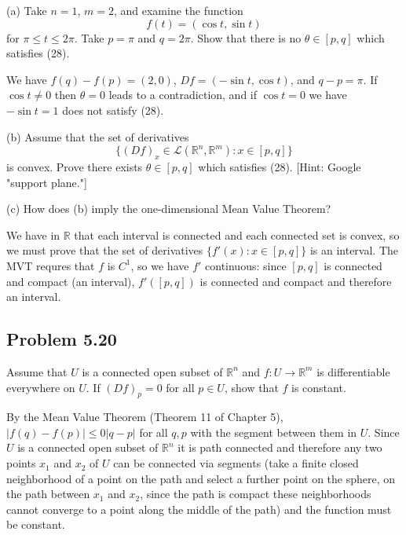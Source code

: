 \documentclass{amsart}
\begin{document}
(a) Take \( n = 1 \), \( m = 2 \), and examine the function
\[
f(t) = (\cos t, \sin t)
\]
for \( \pi \leq t \leq 2\pi \). Take \( p = \pi \) and \( q = 2\pi \). Show that 
there is no \( \theta \in [p,q] \) which satisfies (28).

\medskip \noindent We have $f(q)-f(p)=(2,0)$, $Df=(-\sin t, \cos t)$, and $q-p=\pi$.
If $\cos t\neq 0$ then $\theta=0$ leads to a contradiction, and if $\cos t=0$ we have 
$-\sin t = 1$ does not satisfy (28).

(b) Assume that the set of derivatives
\[
\{ (Df)_x \in \mathcal{L}(\mathbb{R}^n, \mathbb{R}^m) : x \in [p,q] \}
\]
is convex. Prove there exists \( \theta \in [p,q] \) which satisfies (28). 
[Hint: Google "support plane."]

(c) How does (b) imply the one-dimensional Mean Value Theorem?

\medskip \noindent We have in $\mathbb{R}$ that each interval is connected and each connected
set is convex, so we must prove that the set of derivatives $\{f'(x): x\in[p,q]\}$ is an interval. 
The MVT requres that $f$ is $C^1$, so we have $f'$ continuous: since $[p,q]$ is connected and compact
(an interval), $f'([p,q])$ is connected and compact and therefore an interval.

\newpage

\subsection*{Problem 5.20} Assume that \( U \) is a connected open subset 
of \( \mathbb{R}^n \) and \( f : U \rightarrow \mathbb{R}^m \) is differentiable 
everywhere on \( U \). If \( (Df)_p = 0 \) for all \( p \in U \), show that \( f \) is constant.

\medskip \noindent By the Mean Value Theorem (Theorem 11 of Chapter 5), $|f(q)-f(p)|\leq 0|q-p|$ for
all $q, p$ with the segment between them in $U$. Since $U$ is a connected open subset of $\mathbb{R}^n$
it is path connected and therefore any two points $x_1$ and $x_2$ of $U$ can be connected via segments 
(take a finite closed neighborhood of a point on the path and select a further point on the sphere, on the path between $x_1$ and $x_2$,
since the path is compact these neighborhoods cannot converge to a point along the middle of the path)
and
the function must be constant. 

\newpage
\end{document}
